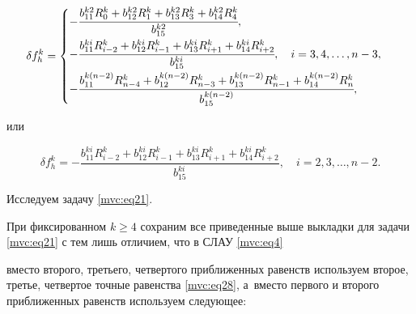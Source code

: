 \begin{equation}

\label{mvc:eq30}

   \delta f_{h}^k=

\begin{cases}

 -\cfrac{b_{11}^{k2} R_{0}^k+b_{12}^{k2} R_{1}^k+b_{13}^{k2} R_{3}^k+b_{14}^{k2} R_{4}^k}{b_{15}^{k2}},

\\[3mm]

-\cfrac{b_{11}^{ki} R_{i-2}^k+b_{12}^{ki} R_{i-1}^k+b_{13}^{ki} R_{i+1}^k+b_{14}^{ki} R_{i+2}^k}{b_{15}^{ki}}

,\quad   i=3,  4,  \dots,  n-3,

\\[3mm]

 -\cfrac{b_{11}^{k(n-2)} R_{n-4}^k+b_{12}^{k(n-2)} R_{n-3}^k+b_{13}^{k(n-2)} R_{n-1}^k+b_{14}^{k(n-2)} R_{n}^k}{b_{15}^{k(n-2)}},

\end{cases}

\end{equation}

или

\begin{equation}

\label{mvc:eq31}

   \delta f_{h}^k=

 -\frac{b_{11}^{ki} R_{i-2}^k+b_{12}^{ki} R_{i-1}^k+b_{13}^{ki} R_{i+1}^k+b_{14}^{ki} R_{i+2}^k}{b_{15}^{ki}}

,\quad   i=2,  3,  \dots,  n-2.

\end{equation}



Исследуем  задачу  \eqref{mvc:eq21}.

При фиксированном $k\geq4$  сохраним все приведенные выше выкладки для задачи \eqref{mvc:eq21} с тем лишь отличием, что в СЛАУ \eqref{mvc:eq4}

вместо второго, третьего, четвертого приближенных равенств используем второе, третье, четвертое точные равенства \eqref{mvc:eq28}, а~вместо первого и второго приближенных равенств используем следующее:


